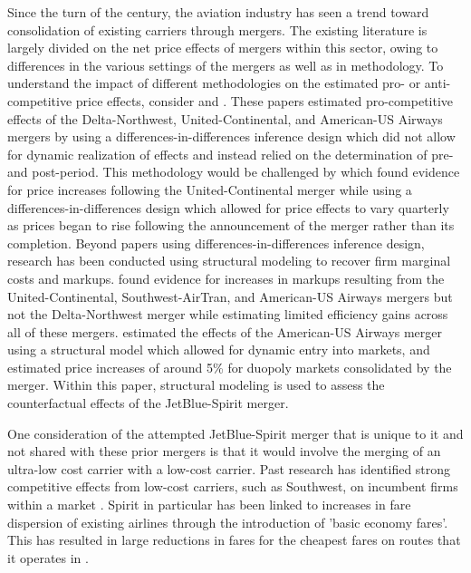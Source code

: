 \documentclass{article}
\begin{document}
	Since the turn of the century, the aviation industry has seen a trend toward consolidation of existing carriers through mergers. The existing literature is largely divided on the net price effects of mergers within this sector, owing to differences in the various settings of the mergers as well as in methodology. To understand the impact of different methodologies on the estimated pro- or anti-competitive price effects, consider \citet{luo_price_2014} and \citet{carlton_are_2019}. These papers estimated pro-competitive effects of the Delta-Northwest, United-Continental, and American-US Airways mergers by using a differences-in-differences inference design which did not allow for dynamic realization of effects and instead relied on the determination of pre- and post-period. This methodology would be challenged by \citet{fan_when_2020} which found evidence for price increases following the United-Continental merger while using a differences-in-differences design which allowed for price effects to vary quarterly as prices began to rise following the announcement of the merger rather than its completion. Beyond papers using differences-in-differences inference design, research has been conducted using structural modeling to recover firm marginal costs and markups. \citet{bet_retrospective_2021} found evidence for increases in markups resulting from the United-Continental, Southwest-AirTran, and American-US Airways mergers but not the Delta-Northwest merger while estimating limited efficiency gains across all of these mergers. \citet{ciliberto_market_2021} estimated the effects of the American-US Airways merger using a structural model which allowed for dynamic entry into markets, and estimated price increases of around 5\% for duopoly markets consolidated by the merger. Within this paper, structural modeling is used to assess the counterfactual effects of the JetBlue-Spirit merger. 

    One consideration of the attempted JetBlue-Spirit merger that is unique to it and not shared with these prior mergers is that it would involve the merging of an ultra-low cost carrier with a low-cost carrier. Past research has identified strong competitive effects from low-cost carriers, such as Southwest, on incumbent firms within a market \citep{morrison_actual_2001, goolsbee_how_2008}. Spirit in particular has been linked to increases in fare dispersion of existing airlines through the introduction of 'basic economy fares'. This has resulted in large reductions in fares for the cheapest fares on routes that it operates in \citep{shrago_spirit_2024}.
    
\end{document}
